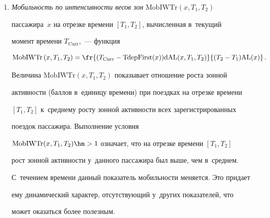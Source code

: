 \begin{enumerate}[1.]
отрезке времени $[T_1, T_2]$~--- функция


$$


\mathrm{MobWTr}\left(x, T_1, T_2\right) = \fr{\mathrm{dAL}\left(x, T_1, T_2\right)}{\mathrm{AL}(x)}\,.


$$





Величина $\mathrm{MobWTr}(x, T_1, T_2)$ всегда лежит в~интервале~$[0, 1]$ 


и~определяет, какую долю в~зонную ак\-тив\-ность пассажира внес\-ли поездки 


на отрезке времени $[T_1, T_2]$.


\item


\textit{Мобильность по интенсивности весов зон} $\mathrm{MobIWTr}(x, T_1, T_2)$ 


пассажира~$x$ на отрезке времени $[T_1, T_2]$, вы\-чис\-лен\-ная в~текущий 


момент времени $T_{\mathrm{Curr}}$,~--- функция


$$


\mathrm{MobIWTr}\left(x, T_1, T_2\right) =


\fr{(T_{\mathrm{Curr}} - \mathrm{TdepFirst}(x))\mathrm{dAL}(x, T_1, T_2)}{(T_2 -T_1)\mathrm{AL}(x)}\,.


$$





Величина $\mathrm{MobIWTr}(x, T_1, T_2)$ показывает отношение рос\-та зонной 


активности (баллов в~единицу времени) при поездках на отрезке времени 


$[T_1, T_2]$ к~среднему рос\-ту зонной ак\-тив\-ности всех зарегистрированных 


поездок пассажира. Выполнение условия  


$\mathrm{MobIWTr}(x, T_1, T_2)\hm> 1$ означает, что на отрезке времени $[T_1, T_2]$ 


рост зонной активности у~данного пассажира был выше, чем в~среднем. 


С~течением времени данный показатель мо\-биль\-ности меняется. Это придает 


ему динамический характер, от\-сут\-ст\-ву\-ющий у~других показателей, что 


может оказаться более полезным.


\end{enumerate}





